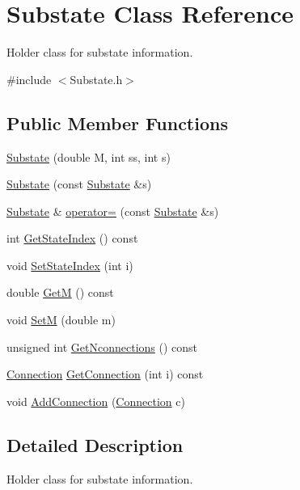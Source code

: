 \hypertarget{classSubstate}{\section{Substate Class Reference}
\label{classSubstate}
}


Holder class for substate information.  




{\ttfamily \#include $<$Substate.\-h$>$}

\subsection*{Public Member Functions}
\begin{DoxyCompactItemize}
\item 
\hyperlink{classSubstate_adc55a0114f54fd9e2e0b284e77177077}{Substate} (double M, int ss, int s)
\item 
\hyperlink{classSubstate_a094e9816b8d0e1ca8a925060aa666a10}{Substate} (const \hyperlink{classSubstate}{Substate} \&s)
\item 
\hyperlink{classSubstate}{Substate} \& \hyperlink{classSubstate_a1fdb1a8a82baf2d03f42a1b7ce37421d}{operator=} (const \hyperlink{classSubstate}{Substate} \&s)
\item 
int \hyperlink{classSubstate_abb2e99735df6a7f342236b08d6845f19}{Get\-State\-Index} () const 
\item 
void \hyperlink{classSubstate_ae5dc83066f50c796155954d7f9c3c1b8}{Set\-State\-Index} (int i)
\item 
double \hyperlink{classSubstate_aa24ecbfaab39eeeb1bbefeb833031930}{Get\-M} () const 
\item 
void \hyperlink{classSubstate_ab36c3c3b2a3862f67d8f0ca69c79b625}{Set\-M} (double m)
\item 
unsigned int \hyperlink{classSubstate_a720d7bdf9c506bde448c9dd68eaa2914}{Get\-Nconnections} () const 
\item 
\hyperlink{classConnection}{Connection} \hyperlink{classSubstate_af5850558a667f170661f5fcb7bcc9f28}{Get\-Connection} (int i) const 
\item 
void \hyperlink{classSubstate_a14f86d11fdf7540b3a6efd5006900cea}{Add\-Connection} (\hyperlink{classConnection}{Connection} c)
\end{DoxyCompactItemize}


\subsection{Detailed Description}
Holder class for substate information. 


